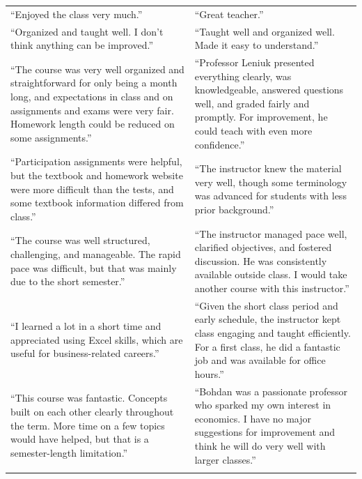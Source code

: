 \documentclass[11pt]{article}
\begin{document}
\begin{longtable}{@{}p{}p{}@{}}
\rowcolor{white} ``Enjoyed the class very much.'' & ``Great teacher.'' \\
\addlinespace
\rowcolor{lightgray} ``Organized and taught well. I don't think anything can be improved.'' & ``Taught well and organized well. Made it easy to understand.'' \\
\addlinespace
\rowcolor{white} ``The course was very well organized and straightforward for only being a month long, and expectations in class and on assignments and exams were very fair. Homework length could be reduced on some assignments.'' & ``Professor Leniuk presented everything clearly, was knowledgeable, answered questions well, and graded fairly and promptly. For improvement, he could teach with even more confidence.'' \\
\addlinespace
\rowcolor{lightgray} ``Participation assignments were helpful, but the textbook and homework website were more difficult than the tests, and some textbook information differed from class.'' & ``The instructor knew the material very well, though some terminology was advanced for students with less prior background.'' \\
\addlinespace
\rowcolor{white} ``The course was well structured, challenging, and manageable. The rapid pace was difficult, but that was mainly due to the short semester.'' & ``The instructor managed pace well, clarified objectives, and fostered discussion. He was consistently available outside class. I would take another course with this instructor.'' \\
\addlinespace
\rowcolor{lightgray} ``I learned a lot in a short time and appreciated using Excel skills, which are useful for business-related careers.'' & ``Given the short class period and early schedule, the instructor kept class engaging and taught efficiently. For a first class, he did a fantastic job and was available for office hours.'' \\
\addlinespace
\rowcolor{white} ``This course was fantastic. Concepts built on each other clearly throughout the term. More time on a few topics would have helped, but that is a semester-length limitation.'' & ``Bohdan was a passionate professor who sparked my own interest in economics. I have no major suggestions for improvement and think he will do very well with larger classes.'' \\
\addlinespace




\bottomrule
\bottomrule
\end{longtable}

\clearpage
\end{document}
